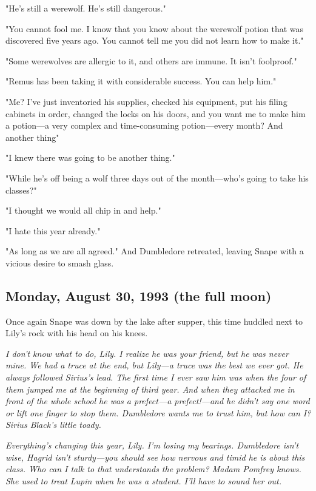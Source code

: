 "He's still a werewolf. He's still dangerous."

"You cannot fool me. I know that you know about the werewolf potion that was discovered five years ago. You cannot tell me you did not learn how to make it."

"Some werewolves are allergic to it, and others are immune. It isn't foolproof."

"Remus has been taking it with considerable success. You can help him."

"Me? I've just inventoried his supplies, checked his equipment, put his filing cabinets in order, changed the locks on his doors, and you want me to make him a potion—a very complex and time-consuming potion—every month? And another thing{\el}"

"I knew there was going to be another thing."

"While he's off being a wolf three days out of the month—who's going to take his classes?"

"I thought we would all chip in and help."

"I hate this year already."

"As long as we are all agreed." And Dumbledore retreated, leaving Snape with a vicious desire to smash glass.

\sbreak

\subsection{Monday, August 30, 1993 (the full moon)}

Once again Snape was down by the lake after supper, this time huddled next to Lily's rock with his head on his knees.

\emph{I don't know what to do, Lily. I realize he was your friend, but he was never mine. We had a truce at the end, but Lily—a truce was the best we ever got. He always followed Sirius's lead. The first time I ever saw him was when the four of them jumped me at the beginning of third year. And when they attacked me in front of the whole school he was a prefect—a prefect!—and he didn't say one word or lift one finger to stop them. Dumbledore wants me to trust him, but how can I? Sirius Black's little toady.}

\emph{Everything's changing this year, Lily. I'm losing my bearings. Dumbledore isn't wise, Hagrid isn't sturdy—you should see how nervous and timid he is about this class. Who can I talk to that understands the problem? Madam Pomfrey knows. She used to treat Lupin when he was a student. I'll have to sound her out.}

